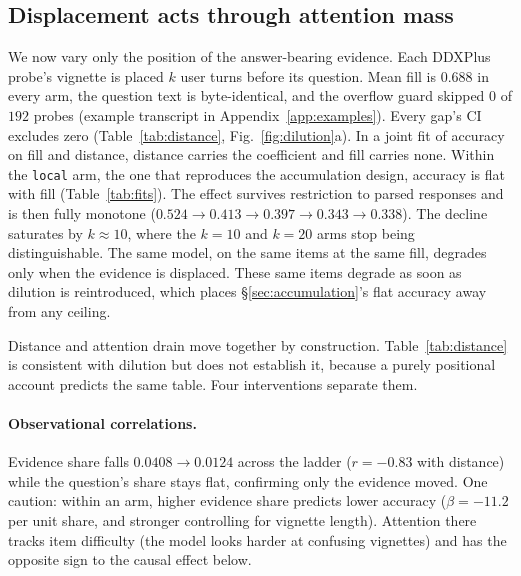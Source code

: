 \documentclass{article}
\begin{document}
\subsection{Displacement acts through attention mass}
\label{sec:displacement}

We now vary only the position of the answer-bearing evidence. Each DDXPlus probe's vignette is
placed $k$ user turns before its question. Mean fill is $0.688$ in every arm, the question text is
byte-identical, and the overflow guard skipped $0$ of $192$ probes (example transcript in
Appendix~\ref{app:examples}). Every gap's CI excludes zero
(Table~\ref{tab:distance}, Fig.~\ref{fig:dilution}a). In a joint fit of accuracy on fill and
distance, distance carries the coefficient and fill carries none. Within the
\texttt{local} arm, the one that reproduces the accumulation design, accuracy is flat with
fill (Table~\ref{tab:fits}). The effect survives restriction to parsed responses and
is then fully monotone ($0.524\to0.413\to0.397\to0.343\to0.338$). The decline saturates by
$k{\approx}10$, where the $k{=}10$ and $k{=}20$ arms stop being distinguishable. The same
model, on the same items at the same fill, degrades only when the evidence is displaced. These
same items degrade as soon as dilution is reintroduced, which places \S\ref{sec:accumulation}'s
flat accuracy away from any ceiling.

Distance and attention drain move together by construction. Table~\ref{tab:distance} is
consistent with dilution but does not establish it, because a purely positional account
predicts the same table. Four interventions separate them.

\paragraph{Observational correlations.}
Evidence share falls $0.0408\to0.0124$ across the ladder ($r=-0.83$ with distance) while the
question's share stays flat, confirming only the evidence moved. One caution:
within an arm, higher evidence share predicts lower accuracy
($\beta=-11.2$ per unit share, and stronger controlling for vignette length). Attention there tracks
item difficulty (the model looks harder at confusing vignettes) and has the opposite sign
to the causal effect below.
\end{document}
